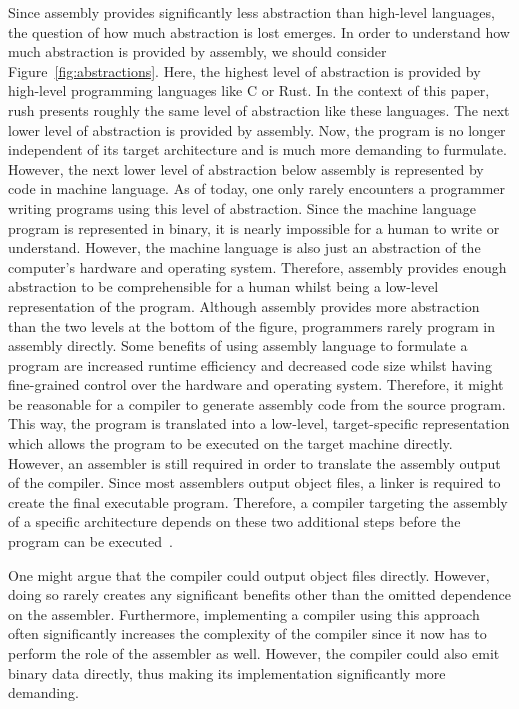 Since assembly provides significantly less abstraction than high-level languages, the question of how much abstraction is lost emerges.
In order to understand how much abstraction is provided by assembly, we should consider Figure~\ref{fig:abstractions}.
Here, the highest level of abstraction is provided by high-level programming languages like C or Rust.
In the context of this paper, rush presents roughly the same level of abstraction like these languages.
The next lower level of abstraction is provided by assembly.
Now, the program is no longer independent of its target architecture and is much more demanding to furmulate.
However, the next lower level of abstraction below assembly is represented by code in machine language.
As of today, one only rarely encounters a programmer writing programs using this level of abstraction.
Since the machine language program is represented in binary, it is nearly impossible for a human to write or understand.
However, the machine language is also just an abstraction of the computer's hardware and operating system.
Therefore, assembly provides enough abstraction to be comprehensible for a human whilst being a low-level representation of the program.
Although assembly provides more abstraction than the two levels at the bottom of the figure, programmers rarely program in assembly directly.
Some benefits of using assembly language to formulate a program are increased runtime efficiency and decreased code size whilst having fine-grained control over the hardware and operating system.
Therefore, it might be reasonable for a compiler to generate assembly code from the source program.
This way, the program is translated into a low-level, target-specific representation which allows the program to be executed on the target machine directly.
However, an assembler is still required in order to translate the assembly output of the compiler.
Since most assemblers output object files, a linker is required to create the final executable program.
Therefore, a compiler targeting the assembly of a specific architecture depends on these two additional steps before the program can be executed~\cite[p.~5-6]{Dandamudi2005}.

One might argue that the compiler could output object files directly.
However, doing so rarely creates any significant benefits other than the omitted dependence on the assembler.
Furthermore, implementing a compiler using this approach often significantly increases the complexity of the compiler since it now has to perform the role of the assembler as well.
However, the compiler could also emit binary data directly, thus making its implementation significantly more demanding.

